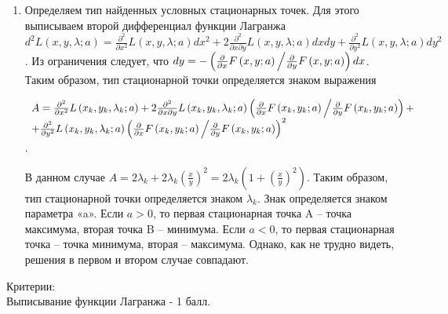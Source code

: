 \documentclass[addpoints, answers]{exam} %
\begin{document}
\begin{questions}
\begin{solution}
\begin{enumerate}
\item  Определяем тип найденных условных стационарных точек. Для этого выписываем второй дифференциал функции Лагранжа $d^{2} L\left(x,y,\lambda ;a\right)=\frac{\partial ^{2} }{\partial x^{2} } L\left(x,y,\lambda ;a\right)dx^{2} +2\frac{\partial ^{2} }{\partial x\partial y} L\left(x,y,\lambda ;a\right)dxdy+\frac{\partial ^{2} }{\partial y^{2} } L\left(x,y,\lambda ;a\right)dy^{2} $. Из ограничения следует, что $dy=-\left({\frac{\partial }{\partial x} F\left(x,y;a\right) \mathord{\left/{\vphantom{\frac{\partial }{\partial x} F\left(x,y;a\right) \frac{\partial }{\partial y} F\left(x,y;a\right)}}\right.\kern-\nulldelimiterspace} \frac{\partial }{\partial y} F\left(x,y;a\right)} \right)dx$. Таким образом, тип стационарной точки определяется знаком выражения 

$\begin{array}{l} {A=\frac{\partial ^{2} }{\partial x^{2} } L\left(x_{k} ,y_{k} ,\lambda _{k} ;a\right)+2\frac{\partial ^{2} }{\partial x\partial y} L\left(x_{k} ,y_{k} ,\lambda _{k} ;a\right)\left({\frac{\partial }{\partial x} F\left(x_{k} ,y_{k} ;a\right) \mathord{\left/{\vphantom{\frac{\partial }{\partial x} F\left(x_{k} ,y_{k} ;a\right) \frac{\partial }{\partial y} F\left(x_{k} ,y_{k} ;a\right)}}\right.\kern-\nulldelimiterspace} \frac{\partial }{\partial y} F\left(x_{k} ,y_{k} ;a\right)} \right)+} \\ {+\frac{\partial ^{2} }{\partial y^{2} } L\left(x_{k} ,y_{k} ,\lambda _{k} ;a\right)\left({\frac{\partial }{\partial x} F\left(x_{k} ,y_{k} ;a\right) \mathord{\left/{\vphantom{\frac{\partial }{\partial x} F\left(x_{k} ,y_{k} ;a\right) \frac{\partial }{\partial y} F\left(x_{k} ,y_{k} ;a\right)}}\right.\kern-\nulldelimiterspace} \frac{\partial }{\partial y} F\left(x_{k} ,y_{k} ;a\right)} \right)^{2} } \end{array}$. 


В данном случае $A=2\lambda _{k} +2\lambda _{k} \left(\frac{x}{y} \right)^{2} =2\lambda _{k} \left(1+\left(\frac{x}{y} \right)^{2} \right)$. Таким образом, тип стационарной точки определяется знаком $\lambda _{k} $. Знак определяется знаком параметра «a». Если $a>0$, то первая стационарная точка A -- точка максимума, вторая точка B -- минимума. Если $a<0$, то первая стационарная точка -- точка минимума, вторая -- максимума. Однако, как не трудно видеть, решения в первом и втором случае совпадают.

\end{enumerate}
Критерии:\\
Выписывание функции Лагранжа - 1 балл.


\end{solution}
\end{questions}
\end{document}
